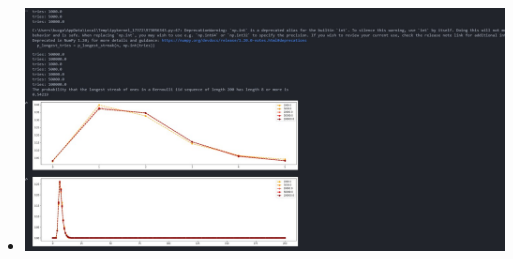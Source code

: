 \documentclass[12pt,twoside]{article}
\begin{document}
\begin{enumerate}
\begin{enumerate}
{\begin{itemize}
     \item \includegraphics[width=15cm]{homework 1/50k_a_day.jpg}
 
 \end{itemize}
}
\end{enumerate}

\end{enumerate}
\end{document}
